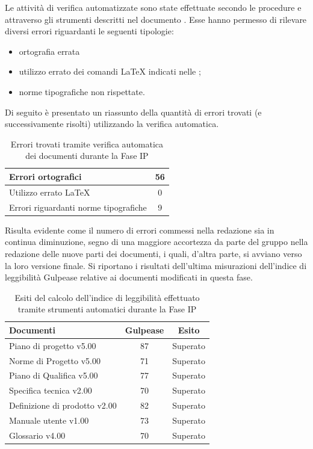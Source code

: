 	Le attività di verifica automatizzate sono state effettuate secondo le procedure e attraverso gli strumenti descritti nel documento . Esse hanno permesso di rilevare diversi errori riguardanti le seguenti tipologie:
	\begin{itemize}
	\item ortografia errata
	\item utilizzo errato dei comandi \LaTeX{} indicati nelle ;
	\item norme tipografiche non rispettate.
	\end{itemize}
	Di seguito è presentato un riassunto della quantità di errori trovati (e successivamente risolti) utilizzando la verifica automatica.
	\begin{table}[H]
		\centering
			\begin{tabu}{| l | c |}
				\hline
				Errori ortografici	& 56	\\ \hline
				Utilizzo errato \LaTeX{}	& 0	\\ \hline
				Errori riguardanti norme tipografiche	& 9	\\ \hline
			\end{tabu}
		\caption{Errori trovati tramite verifica automatica dei documenti durante la Fase IP}
	\end{table}

	Risulta evidente come il numero di errori commessi nella redazione sia in continua diminuzione, segno di una maggiore accortezza da parte del gruppo nella redazione delle nuove parti dei documenti, i quali, d'altra parte, si avviano verso la loro versione finale.
	Si riportano i risultati dell'ultima misurazioni dell'indice di leggibilità Gulpease relative ai documenti modificati in questa fase.

	\begin{table}[H]
		\centering
			\begin{tabu}{| l | c | c |}
				\hline
				Documenti 							& Gulpease	& Esito		\\ \hline \hline
				Piano di progetto v5.00				& 87 		& Superato  \\ \hline
				Norme di Progetto v5.00 			& 71		& Superato  \\ \hline
				Piano di Qualifica v5.00 			& 77		& Superato  \\ \hline
				Specifica tecnica v2.00				& 70		& Superato \\ \hline
				Definizione di prodotto v2.00		& 82		& Superato \\ \hline
				Manuale utente v1.00				& 73		& Superato \\ \hline
				Glossario v4.00					 	& 70 		& Superato  \\ \hline
			\end{tabu}
		\caption{Esiti del calcolo dell'indice di leggibilità effettuato tramite strumenti automatici durante la Fase IP}
	\end{table}

